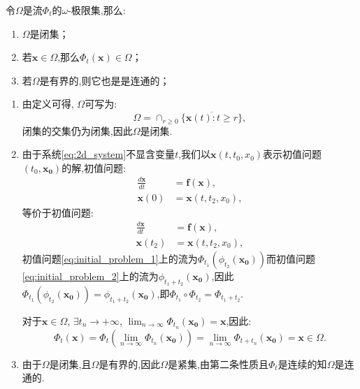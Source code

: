 \begin{prop}\label{prop:omega_limit_set}

    令$\Omega$是流$\Phi_t$的$\omega$-极限集,那么:
    \begin{enumerate}
        \item $\Omega$是闭集；
        \item 若$\mathbf{x}\in \Omega$,那么$\Phi_t(\mathbf{x})\in \Omega$；
        \item 若$\Omega$是有界的,则它也是是连通的；
    \end{enumerate}
\end{prop}
\begin{pf}

    \begin{enumerate}
        \item 由定义可得, $\Omega$可写为:
              \begin{equation}
                  \Omega=\cap_{r\geq 0}\overline{\{\mathbf{x}(t):t\geq r\}},
              \end{equation}
              闭集的交集仍为闭集,因此$\Omega$是闭集. 
        \item 由于系统\ref{eq:2d_system}不显含变量$t$,我们以$\mathbf{x}(t,t_0,x_0)$表示初值问题$(t_0,\mathbf{x_0})$的解,初值问题:
              \begin{equation}\label{eq:initial_problem_1}
                  \begin{aligned}
                      \frac{d\mathbf{x}}{dt} & =\mathbf{f}(\mathbf{x}), \\
                      \mathbf{x}(0)          & =\mathbf{x}(t,t_2,x_0),
                  \end{aligned}
              \end{equation}
              等价于初值问题:
              \begin{equation}\label{eq:initial_problem_2}
                  \begin{aligned}
                      \frac{d\mathbf{x}}{dt} & =\mathbf{f}(\mathbf{x}), \\
                      \mathbf{x}(t_2)        & =\mathbf{x}(t,t_2,x_0),
                  \end{aligned}
              \end{equation}
              初值问题\ref{eq:initial_problem_1}上的流为$\Phi_{t_1}(\phi_{t_2}(\mathbf{x_0}))$而初值问题\ref{eq:initial_problem_2}上的流为$\phi_{t_1+t_2}(\mathbf{x_0})$,因此$\Phi_{t_1}(\phi_{t_2}(\mathbf{x_0}))=\phi_{t_1+t_2}(\mathbf{x_0})$,即$\Phi_{t_1}\circ\Phi_{t_2}=\Phi_{t_1+t_2}$. 

              对于$\mathbf{x}\in\Omega$, $\exists t_n\to +\infty$, $\lim_{n\to\infty}\Phi_{t_n}(\mathbf{x_0})=\mathbf{x}$,因此:
              \begin{equation}
                  \Phi_t(\mathbf{x})=\Phi_{t}(\lim_{n\to\infty}\Phi_{t_n}(\mathbf{x_0}))=\lim_{n\to\infty}\Phi_{t+t_n}(\mathbf{x_0})=\mathbf{x}\in \Omega.
              \end{equation}
        \item 由于$\Omega$是闭集,且$\Omega$是有界的,因此$\Omega$是紧集,由第二条性质且$\Phi_t$是连续的知$\Omega$是连通的. 
    \end{enumerate}
\end{pf}
